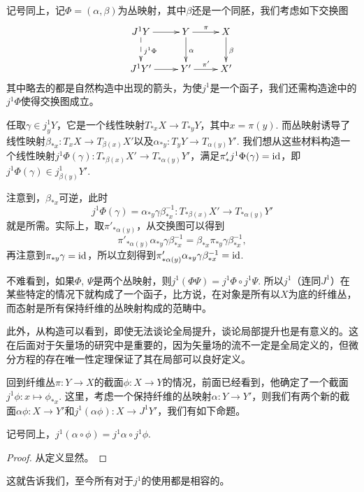 \begin{para}[丛映射的提升]
    记号同上，记$\Phi=(\alpha,\beta)$为丛映射，其中$\beta$还是一个同胚，我们考虑如下交换图
    \[
        \xymatrix{
            J^1Y \ar[r] \ar@{-->}[d]^{j^1\Phi} &Y\ar[r]^\pi\ar[d]^\alpha&X\ar[d]^\beta\\
            J^1Y' \ar[r] &Y'\ar[r]^{\pi'}&X'
        }
    \]
    其中略去的都是自然构造中出现的箭头，为使$j^1$是一个函子，我们还需构造途中的$j^1\Phi$使得交换图成立。

    任取$\gamma\in j^1_yY$，它是一个线性映射$T_{*x}X\to T_{*y}Y$，其中$x=\pi(y)$. 而丛映射诱导了线性映射$\beta_{*x}:T_xX\to T_{\beta(x)}X'$以及$\alpha_{*y}:T_yY\to T_{\alpha(y)}Y'$. 我们想从这些材料构造一个线性映射$j^1\Phi(\gamma):T_{*\beta(x)}X'\to T_{*\alpha(y)}Y'$，满足$\pi'_*j^1\Phi(\gamma)=\operatorname{id}$，即$j^1\Phi(\gamma)\in j^1_{\beta(y)}Y'$.
    
    注意到，$\beta_{*x}$可逆，此时
    \[
        j^1\Phi(\gamma)=\alpha_{*y}\gamma \beta_{*x}^{-1}:T_{*\beta(x)}X'\to T_{*\alpha(y)}Y'
    \]
    就是所需。实际上，取$\pi'_{*\alpha(y)}$，从交换图可以得到
    \[
        \pi'_{*\alpha(y)}\alpha_{*y}\gamma \beta_{*x}^{-1}=\beta_{*x}\pi_{*y}\gamma \beta_{*x}^{-1},
    \]
    再注意到$\pi_{*y}\gamma=\operatorname{id}$，所以立刻得到$\pi'_{*\alpha(y)}\alpha_{*y}\gamma \beta_{*x}^{-1}=\operatorname{id}$. 

    不难看到，如果$\Phi$, $\Psi$是两个丛映射，则$j^1(\Phi\Psi)=j^1\Phi \circ j^1\Psi$. 所以$j^1$（连同$J^1$）在某些特定的情况下就构成了一个函子，比方说，在对象是所有以$X$为底的纤维丛，而态射是所有保持纤维的丛映射构成的范畴中。

    此外，从构造可以看到，即使无法谈论全局提升，谈论局部提升也是有意义的。这在后面对于矢量场的研究中是重要的，因为矢量场的流不一定是全局定义的，但微分方程的存在唯一性定理保证了其在局部可以良好定义。
\end{para}

回到纤维丛$\pi:Y\to X$的截面$\phi:X\to Y$的情况，前面已经看到，他确定了一个截面$j^1 \phi:x\mapsto \phi_{*x}$. 这里，考虑一个保持纤维的丛映射$\alpha:Y\to Y'$，则我们有两个新的截面$\alpha\phi:X\to Y'$和$j^1(\alpha\phi):X\to J^1Y'$，我们有如下命题。

\begin{lem}
    记号同上，$j^1(\alpha\circ \phi)=j^1\alpha \circ j^1\phi$.
\end{lem}

\begin{proof}
    从定义显然。
\end{proof}

这就告诉我们，至今所有对于$j^1$的使用都是相容的。

